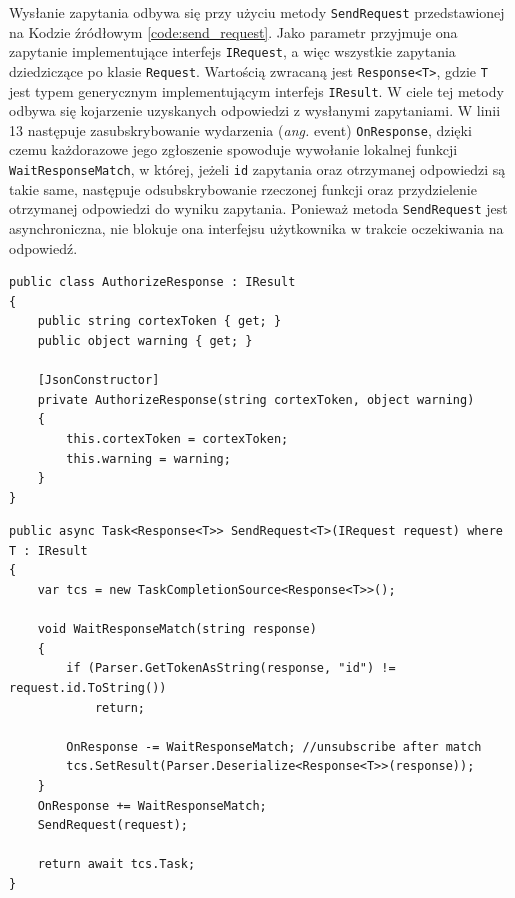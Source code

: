 \documentclass[skorowidz,skroty]{dyplomWEZUT}
\begin{document}
\pagebreak

Wysłanie zapytania odbywa się przy użyciu metody \lstinline[language={[Sharp]C}]{SendRequest} przedstawionej na Kodzie źródłowym \vref{code:send_request}. Jako parametr przyjmuje ona zapytanie implementujące interfejs \lstinline[language={[Sharp]C}]{IRequest}, a więc wszystkie zapytania dziedziczące po klasie \lstinline[language={[Sharp]C}]{Request}. Wartością zwracaną jest \lstinline[language={[Sharp]C}]{Response<T>}, gdzie \lstinline[language={[Sharp]C}]{T} jest typem generycznym implementującym interfejs \lstinline[language={[Sharp]C}]{IResult}. W ciele tej metody odbywa się kojarzenie uzyskanych odpowiedzi z wysłanymi zapytaniami. W linii 13 następuje zasubskrybowanie wydarzenia (\textit{ang.} event) \lstinline[language={[Sharp]C}]{OnResponse}, dzięki czemu każdorazowe jego zgłoszenie spowoduje wywołanie lokalnej funkcji \lstinline[language={[Sharp]C}]{WaitResponseMatch}, w której, jeżeli \lstinline[language={[Sharp]C}]{id} zapytania oraz otrzymanej odpowiedzi są takie same, następuje odsubskrybowanie rzeczonej funkcji oraz przydzielenie otrzymanej odpowiedzi do wyniku zapytania. Ponieważ metoda \lstinline[language={[Sharp]C}]{SendRequest} jest asynchroniczna, nie blokuje ona interfejsu użytkownika w trakcie oczekiwania na odpowiedź.

\begin{lstlisting}[language={[Sharp]C}]
public class AuthorizeResponse : IResult
{
    public string cortexToken { get; }
    public object warning { get; }

    [JsonConstructor]
    private AuthorizeResponse(string cortexToken, object warning)
    {
        this.cortexToken = cortexToken;
        this.warning = warning;
    }
}
\end{lstlisting}

\begin{lstlisting}[language={[Sharp]C}]
public async Task<Response<T>> SendRequest<T>(IRequest request) where T : IResult
{
    var tcs = new TaskCompletionSource<Response<T>>();

    void WaitResponseMatch(string response)
    {
        if (Parser.GetTokenAsString(response, "id") != request.id.ToString())
            return;

        OnResponse -= WaitResponseMatch; //unsubscribe after match
        tcs.SetResult(Parser.Deserialize<Response<T>>(response));
    }
    OnResponse += WaitResponseMatch;
    SendRequest(request);

    return await tcs.Task;
}
\end{lstlisting}
\end{document}
